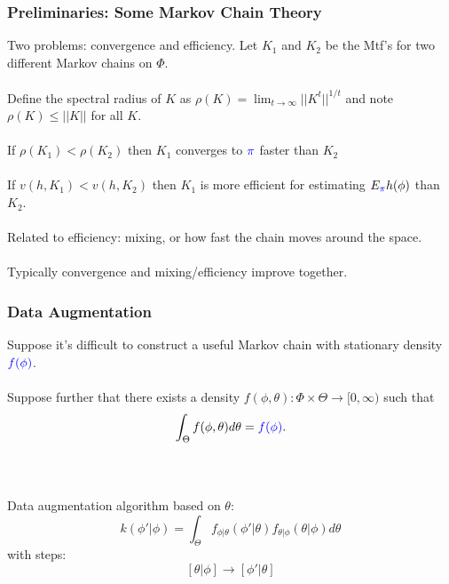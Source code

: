 \documentclass[xcolor=dvipsnames]{beamer}
\begin{document}
\begin{frame}
\frametitle{Preliminaries: Some Markov Chain Theory}
Two problems: convergence and efficiency. Let $K_1$ and $K_2$ be the Mtf's for two different Markov chains on $\Phi$.\\~\\

\pause Define the spectral radius of $K$ as $\rho(K) = \lim_{t\to\infty}||K^t||^{1/t}$ and note $\rho(K)\leq ||K||$ for all $K$.\\~\\

\pause If $\rho(K_1) < \rho(K_2)$ then $K_1$ converges to ${\color{blue}\pi}$ faster than $K_2$\\~\\

\pause If $v(h,K_1) < v(h,K_2)$ then $K_1$ is more efficient for estimating $E_{\color{blue}\pi}h(\phi)$ than $K_2$.\\~\\

\pause Related to efficiency: mixing, or how fast the chain moves around the space. \\~\\

\pause Typically convergence and mixing/efficiency improve together.
\end{frame}

\begin{frame}
\frametitle{Data Augmentation}
Suppose it's difficult to construct a useful Markov chain with stationary density ${\color{blue}f(\phi)}$.\\~\\

Suppose further that there exists a density $f(\phi,\theta):\Phi\times\Theta\to [0,\infty)$ such that
\[
\int_{\Theta}f(\phi,\theta)d\theta = {\color{blue}f(\phi)}.
\]
\\~

\pause Data augmentation algorithm \citep{tanner1987calculation} based on $\theta$:
\[
k(\phi'|\phi)=\int_{\Theta}f_{\phi|\theta}(\phi'|\theta)f_{\theta|\phi}(\theta|\phi)d\theta
\]
with steps:
\[
[\theta|\phi]\to[\phi'|\theta]
\]
\end{frame}
\end{document}
